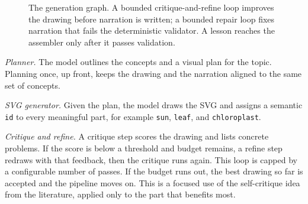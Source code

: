 \documentclass[conference]{IEEEtran}
\begin{document}
\begin{figure}[t]
\centering
{}
\caption{The generation graph. A bounded critique-and-refine loop improves the
drawing before narration is written; a bounded repair loop fixes narration that
fails the deterministic validator. A lesson reaches the assembler only after it
passes validation.}
\label{fig:pipeline}
\end{figure}

\emph{Planner.} The model outlines the concepts and a visual plan for the topic.
Planning once, up front, keeps the drawing and the narration aligned to the same
set of concepts.

\emph{SVG generator.} Given the plan, the model draws the SVG and assigns a
semantic \texttt{id} to every meaningful part, for example \texttt{sun},
\texttt{leaf}, and \texttt{chloroplast}.

\emph{Critique and refine.} A critique step scores the drawing and lists
concrete problems. If the score is below a threshold and budget remains, a refine
step redraws with that feedback, then the critique runs again. This loop is
capped by a configurable number of passes. If the budget runs out, the best
drawing so far is accepted and the pipeline moves on. This is a focused use of
the self-critique idea from the literature, applied only to the part that
benefits most.
\end{document}
